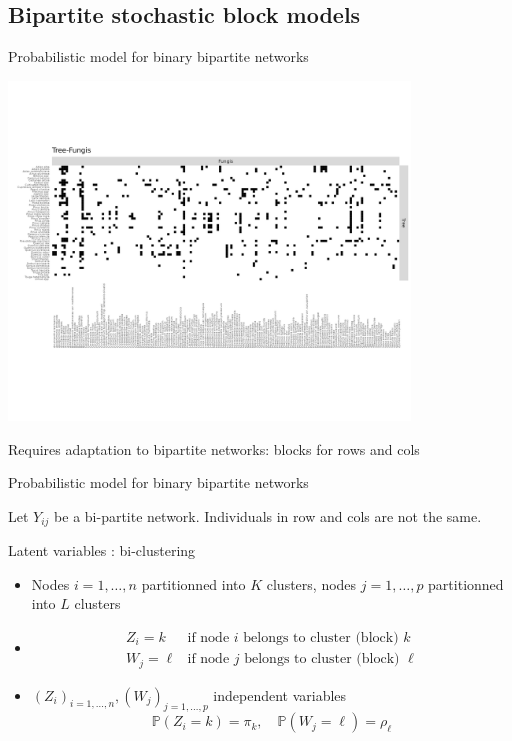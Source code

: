 \documentclass[compress,10pt]{beamer}
\begin{document}
\subsection[LBM]{Bipartite stochastic block models}

\begin{frame}{Probabilistic model for binary  bipartite networks}

\includegraphics[width=0.8\textwidth]{plots/Tree_fungis_matrix}


\centering
Requires adaptation to bipartite networks: blocks for rows and cols
\end{frame}


\begin{frame}{Probabilistic model for binary  bipartite networks}

Let $Y_{ij}$ be a bi-partite network. Individuals in row and cols are not the same. 

\begin{block}{Latent variables : bi-clustering}
\begin{itemize}
\item Nodes $i= 1,\dots,n$   partitionned into $K$ clusters,  nodes $j= 1,\dots,p$  partitionned into $L$ clusters
\item $$\begin{array}{cl}
Z_i = k & \mbox{if node $i$ belongs to cluster (block) $k$}\\
W_j = \ell & \mbox{if node $j$ belongs to cluster (block) $\ell$}
\end{array}$$
\item $(Z_i)_{i=1,\dots,n}, (W_j)_{j=1, \dots,p}$ independent variables
$$ \mathbb{P}(Z_i = k) = \pi_k,\quad  \mathbb{P}(W_j = \ell) = \rho_\ell$$
\end{itemize}
\end{block}

\end{frame}
\end{document}
